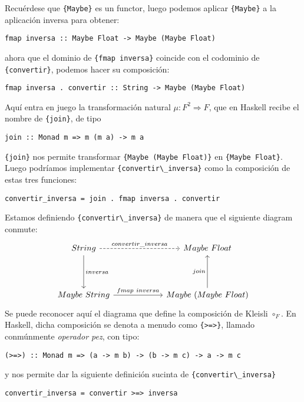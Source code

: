 \documentclass[12pt, twoside]{book}
\newcommand{\newterm}[1]{\index{#1}\emph{#1}}
\newcommand{\code}[1]{\Verb+{#1}+}
\begin{document}
Recuérdese que \code{Maybe} es un functor, luego podemos aplicar \code{Maybe} a la aplicación inversa para obtener:
\begin{verbatim}
fmap inversa :: Maybe Float -> Maybe (Maybe Float)
\end{verbatim}
ahora que el dominio de \code{fmap inversa} coincide con el codominio de \code{convertir}, podemos hacer su composición:
\begin{verbatim}
fmap inversa . convertir :: String -> Maybe (Maybe Float) 
\end{verbatim}
Aquí entra en juego la transformación natural $\mu \colon F^2 \Rightarrow F$, que en Haskell recibe el nombre de \code{join}, de tipo 
\begin{verbatim}
join :: Monad m => m (m a) -> m a
\end{verbatim}
\code{join} nos permite transformar \code{Maybe (Maybe Float)} en \code{Maybe Float}.
Luego podríamos implementar \code{convertir\_inversa} como la composición de estas tres funciones:
\begin{verbatim}
convertir_inversa = join . fmap inversa . convertir
\end{verbatim}
Estamos definiendo \code{convertir\_inversa} de manera que el siguiente diagram conmute:
\begin{displaymath}\begin{tikzcd}[column sep=6em,row sep=4em]
{String} \arrow[r,"convertir\_inversa",dashed] \arrow[d,"inversa"]& {Maybe\ Float}\\
{Maybe\ String} \arrow[r,"{fmap\ inversa}"] & {Maybe\ (Maybe\ Float)} \arrow[u,"join"]
\end{tikzcd}\end{displaymath}
Se puede reconocer aquí el diagrama que define la composición de Kleisli $\circ_F$.
En Haskell, dicha composición se denota a menudo como \code{>=>}, llamado conmúnmente \newterm{operador pez}, con tipo:

\begin{verbatim}
(>=>) :: Monad m => (a -> m b) -> (b -> m c) -> a -> m c
\end{verbatim}

y nos permite dar la siguiente definición sucinta de \code{convertir\_inversa}
\begin{verbatim}
convertir_inversa = convertir >=> inversa
\end{verbatim}
\end{document}
